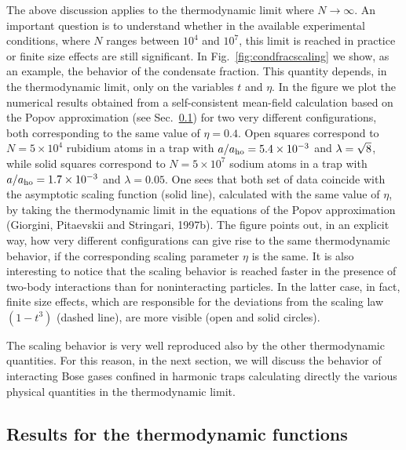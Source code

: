 The above discussion applies to the thermodynamic limit where
$N\to\infty$. An important question is to understand whether in the
available experimental conditions, where $N$ ranges between $10^4$
and $10^7$, this limit is reached in practice or finite size
effects are still significant. In Fig.~\ref{fig:condfracscaling}
we show, as an example, the behavior of the condensate fraction.
This quantity depends, in the thermodynamic limit, only on the
variables $t$ and $\eta$. In the figure we plot the numerical results
obtained   from a self-consistent mean-field calculation based on the
Popov approximation  (see Sec.~\ref{sec:therm5}) for two very different
configurations,  both corresponding to the same value of $\eta =0.4$.
Open squares correspond to  $N=5\times 10^4$ rubidium 
atoms in a trap with $a/a_{\rm ho}= 5.4\times 10^{-3}$ and $\lambda=
\protect \sqrt{8}$, while solid squares correspond to $N=5\times 10^7$ 
sodium atoms in a trap with $a/a_{\rm ho}=1.7\times 10^{-3}$ and 
$\lambda=0.05$.  One sees that both set of data 
coincide with the asymptotic scaling function (solid line), calculated 
with the same value of $\eta$, by taking the thermodynamic limit 
in the equations of the Popov approximation 
(Giorgini, Pitaevskii and Stringari, 
1997b). The figure points out, in an explicit way, how very different
configurations can  give rise to the same thermodynamic behavior,
if the corresponding scaling parameter $\eta$ is the same.  It is also
interesting to notice that the scaling behavior is reached faster in the
presence of two-body  interactions than for noninteracting particles. In
the latter case, in fact, finite size  effects, which are responsible for
the deviations from the scaling law $(1-t^3)$ (dashed line), are  
more visible (open and solid circles). 

The scaling behavior is very well reproduced also by the other
thermodynamic quantities. For this reason, in the next section, we
will  discuss the  behavior of interacting Bose gases confined in
harmonic traps calculating directly the various physical quantities
in  the thermodynamic  limit.


\subsection{Results for the thermodynamic functions}
\label{sec:therm5}

